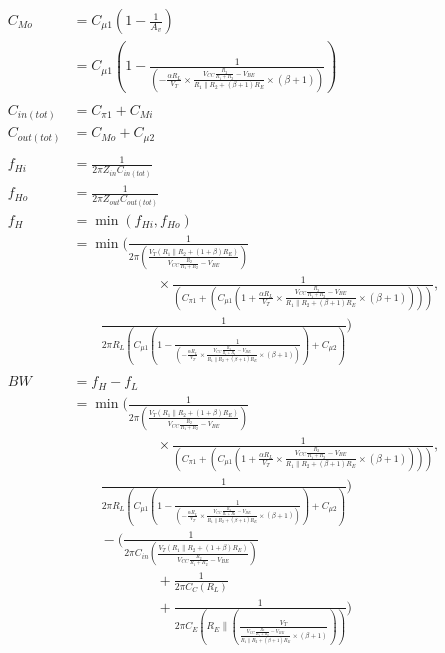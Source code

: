 \documentclass[11pt, a4paper]{article}
\begin{document}
\begin{align*}
C_{Mo} &= C_{\mu1} \left(1 - \frac{1}{A_v}\right)\\
&= C_{\mu1} \left(1 - \frac{1}{(-\frac{\alpha R_L}{V_T} \times \frac{V_{CC}\frac{R_2}{R_1+R_2}-V_{BE}}{R_1 \parallel R_2 + (\beta+1)R_E} \times (\beta + 1))}\right)\\ \\
C_{in(tot)} &= C_{\pi1} + C_{Mi}\\
C_{out(tot)} &= C_{Mo} + C_{\mu2}\\ \\
f_{Hi} &= \frac{1}{2\pi Z_{in} C_{in(tot)}}\\
f_{Ho} &= \frac{1}{2\pi Z_{out} C_{out(tot)}}\\
f_H &= \min(f_{Hi}, f_{Ho})\\
&= \min\Bigg(
    \frac{1}{2\pi (\frac{V_T (R_1 \parallel R_2 + (1+\beta)R_E)}{V_{CC}\frac{R_2}{R_1+R_2}-V_{BE}})} \\
&\qquad\qquad\qquad \times \frac{1}{(C_{\pi1} + (C_{\mu1} \left(1 + \frac{\alpha R_L}{V_T} \times \frac{V_{CC}\frac{R_2}{R_1+R_2}-V_{BE}}{R_1 \parallel R_2 + (\beta+1)R_E} \times (\beta + 1) \right)))}, \\
&\qquad \frac{1}{2\pi R_L (C_{\mu1} \left(1 - \frac{1}{(-\frac{\alpha R_L}{V_T} \times \frac{V_{CC}\frac{R_2}{R_1+R_2}-V_{BE}}{R_1 \parallel R_2 + (\beta+1)R_E} \times (\beta + 1))}\right) + C_{\mu2})}
\Bigg)\\ \\
BW &= f_H - f_L\\
&= \min\Bigg(
    \frac{1}{2\pi (\frac{V_T (R_1 \parallel R_2 + (1+\beta)R_E)}{V_{CC}\frac{R_2}{R_1+R_2}-V_{BE}})} \\
&\qquad\qquad\qquad \times \frac{1}{(C_{\pi1} + (C_{\mu1} \left(1 + \frac{\alpha R_L}{V_T} \times \frac{V_{CC}\frac{R_2}{R_1+R_2}-V_{BE}}{R_1 \parallel R_2 + (\beta+1)R_E} \times (\beta + 1) \right)))}, \\
&\qquad \frac{1}{2\pi R_L (C_{\mu1} \left(1 - \frac{1}{(-\frac{\alpha R_L}{V_T} \times \frac{V_{CC}\frac{R_2}{R_1+R_2}-V_{BE}}{R_1 \parallel R_2 + (\beta+1)R_E} \times (\beta + 1))}\right) + C_{\mu2})}
\Bigg) \\
&\qquad - \Bigg(
    \frac{1}{2\pi C_{in} (\frac{V_T (R_1 \parallel R_2 + (1+\beta)R_E)}{V_{CC}\frac{R_2}{R_1+R_2}-V_{BE}})} \\
&\qquad\qquad\qquad + \frac{1}{2\pi C_C (R_L)} \\
&\qquad\qquad\qquad + \frac{1}{2\pi C_E (R_E \parallel (\frac{V_T}{\frac{V_{CC}\frac{R_2}{R_1+R_2}-V_{BE}}{R_1 \parallel R_2 + (\beta+1)R_E} \times (\beta + 1)}))}
\Bigg)
\end{align*}
\end{document}
